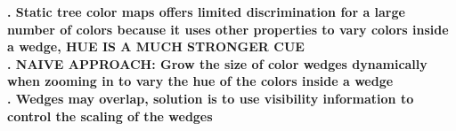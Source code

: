 \documentclass[review,journal]{vgtc}         %
\begin{document}

\textbf{. Static tree color maps offers limited discrimination for a large number of colors because it uses other properties to vary colors inside a wedge, HUE IS A MUCH STRONGER CUE} \\


\textbf{. NAIVE APPROACH: Grow the size of color wedges dynamically when zooming in to vary the hue of the colors inside a wedge} \\


\textbf{. Wedges may overlap, solution is to use visibility information to control the scaling of the wedges} \\

\end{document}

